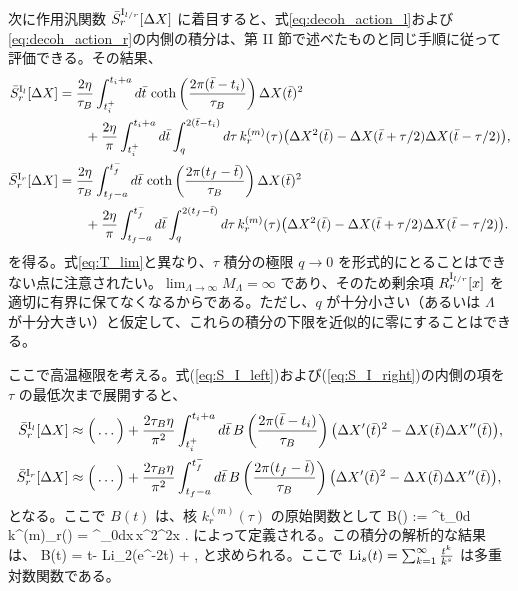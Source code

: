 次に作用汎関数 $\bar{S}^{{\rm I}_{l/r}}_r[\Delta X]$ に着目すると、式\eqref{eq:decoh_action_l}および\eqref{eq:decoh_action_r}の内側の積分は、第 II 節で述べたものと同じ手順に従って評価できる。その結果、
\begin{subequations}
\begin{align}
	\bar{S}^{{\rm I}_l}_r[\Delta X] &= \frac{2\eta}{\tau_B}\int^{t_i+a}_{t^+_i}d\bar{t}\,\coth\left(\frac{2\pi(\bar{t}-t_i)}{\tau_B}\right)\Delta X(\bar{t})^2 \nonumber\\
		      &\qquad + \frac{2\eta}{\pi}\int^{t_i+a}_{t^+_i}d\bar{t} \int^{2(\bar{t}-t_i)}_qd\tau\,k^{(m)}_r(\tau)\big(\Delta X^2(\bar{t}) - \Delta X(\bar{t} + \tau/2)\Delta X(\bar{t} - \tau/2)\big), \label{eq:S_I_left}\\
	\bar{S}^{{\rm I}_r}_r[\Delta X] &= \frac{2\eta}{\tau_B}\int^{t^-_f}_{t_f-a}d\bar{t}\,\coth\left(\frac{2\pi(t_f-\bar{t})}{\tau_B}\right)\Delta X(\bar{t})^2 \nonumber\\
		      &\qquad + \frac{2\eta}{\pi}\int^{t^-_f}_{t_f-a}d\bar{t} \int^{2(t_f-\bar{t})}_qd\tau\,k^{(m)}_r(\tau)\big(\Delta X^2(\bar{t}) - \Delta X(\bar{t} + \tau/2)\Delta X(\bar{t} - \tau/2)\big). \label{eq:S_I_right}
\end{align}
\end{subequations}
を得る。式\eqref{eq:T_lim}と異なり、$\tau$ 積分の極限 $q\rightarrow0$ を形式的にとることはできない点に注意されたい。$\lim_{\Lambda\rightarrow\infty}M_{\Lambda}=\infty$ であり、そのため剰余項 $R^{{\rm I}_{l/r}}_r[x]$ を適切に有界に保てなくなるからである。ただし、$q$ が十分小さい（あるいは $\Lambda$ が十分大きい）と仮定して、これらの積分の下限を近似的に零にすることはできる。

ここで高温極限を考える。式(\ref{eq:S_I_left})および(\ref{eq:S_I_right})の内側の項を $\tau$ の最低次まで展開すると、
\begin{subequations}
\begin{align}
	\bar{S}^{{\rm I}_l}_r[\Delta X] &\approx \Big(\dots\Big) + \frac{2\tau_B\eta}{\pi^2}\int^{t_i+a}_{t^+_i}d\bar{t}\, B\left(\frac{2\pi(\bar{t}-t_i)}{\tau_B}\right)\big(\Delta X'(\bar{t})^2 - \Delta X(\bar{t})\Delta X''(\bar{t})\big), \label{eq:S_I_l_htl} \\
	\bar{S}^{{\rm I}_r}_r[\Delta X] &\approx\Big(\dots\Big) + \frac{2\tau_B\eta}{\pi^2}\int^{t^-_f}_{t_f-a}d\bar{t}\,B\left(\frac{2\pi(t_f-\bar{t})}{\tau_B}\right)\big(\Delta X'(\bar{t})^2 - \Delta X(\bar{t})\Delta X''(\bar{t})\big), \label{eq:S_I_r_htl}
\end{align}
\end{subequations}
となる。ここで $B(t)$ は、核 $k^{(m)}_r(\tau)$ の原始関数として
\be\label{eq:B}
	B\Big(\Big) := \int^t_0d\tau\,k^{(m)}_r(\tau) = \int^{}_0dx\,x^2\csh^2x .
\ee
によって定義される。この積分の解析的な結果は、
\be\label{eq:B_scaled}
        B(t) = t - {\rm Li}_2(e^{-2t}) + ,
\ee
と求められる。ここで ${\rm Li}_s(t) = \sum^{\infty}_{k=1}\frac{t^k}{k^s}$ は多重対数関数である。

